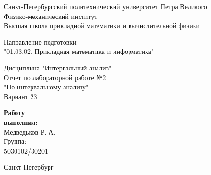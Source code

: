 \documentclass[12pt,a4paper]{article}
\begin{document}
\begin{titlepage}
\setlength{\baselineskip}{15pt}
\begin{center}
Санкт-Петербургский политехнический университет Петра Великого\\
Физико-механический институт\\
Высшая школа прикладной математики и вычислительной физики
\vspace{30mm}

Направление подготовки\\
"01.03.02. Прикладная математика и информатика"
\vspace{27mm}

{\fontsize{20}{24}\selectfont Дисциплина "Интервальный анализ"}\\[5mm]
Отчет по лабораторной работе №2\\[2mm]
"По интервальному анализу"\\[4mm]
Вариант 23
\end{center}
\vspace{35mm}
\begin{flushright}
\begin{minipage}{38mm}
\raggedright
\textbf{Работу\\выполнил:}\\
Медведьков Р. А.\\
Группа:\\
5030102/30201
\end{minipage}
\end{flushright}
\vfill
\begin{center}Санкт-Петербург\end{center}
\end{titlepage}
\end{document}
